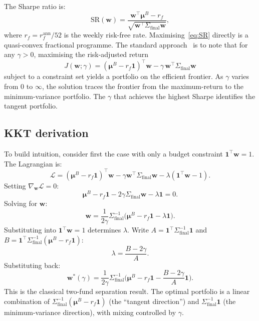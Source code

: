 \documentclass[10pt,twocolumn]{article}
\newcommand{\bw}{\bm{w}}
\newcommand{\bmu}{\bm{\mu}}
\begin{document}
The Sharpe ratio is:
\begin{equation}\label{eq:SR}
\mathrm{SR}(\bw) = \frac{\bw^\top\bmu^B - r_f}
  {\sqrt{\bw^\top\Sigma_{\mathrm{final}}\bw}},
\end{equation}
where $r_f=r_f^{\mathrm{ann}}/52$ is the weekly risk-free rate.
Maximising~\eqref{eq:SR} directly is a quasi-convex fractional
programme.  The standard approach~\cite{cornuejols2007} is to note
that for any $\gamma>0$, maximising the risk-adjusted return
\begin{equation}\label{eq:J}
J(\bw;\gamma) = (\bmu^B{-}r_f\bm{1})^\top\bw
  - \gamma\,\bw^\top\Sigma_{\mathrm{final}}\bw
\end{equation}
subject to a constraint set yields a portfolio on the efficient
frontier.  As $\gamma$ varies from $0$ to $\infty$, the solution
traces the frontier from the maximum-return to the minimum-variance
portfolio.  The $\gamma$ that achieves the highest Sharpe identifies
the tangent portfolio.

\subsection{KKT derivation}

To build intuition, consider first the case with only a budget
constraint $\bm{1}^\top\bw=1$.  The Lagrangian is:
\begin{equation}\label{eq:lagrangian}
\mathcal{L} = (\bmu^B{-}r_f\bm{1})^\top\bw
  - \gamma\bw^\top\Sigma_{\mathrm{final}}\bw
  - \lambda(\bm{1}^\top\bw-1).
\end{equation}
Setting $\nabla_{\bw}\mathcal{L}=0$:
\begin{equation}\label{eq:foc}
\bmu^B - r_f\bm{1} - 2\gamma\Sigma_{\mathrm{final}}\bw
  - \lambda\bm{1} = 0.
\end{equation}
Solving for $\bw$:
\begin{equation}\label{eq:w_closed}
\bw = \frac{1}{2\gamma}\Sigma_{\mathrm{final}}^{-1}
  \big(\bmu^B - r_f\bm{1} - \lambda\bm{1}\big).
\end{equation}
Substituting into $\bm{1}^\top\bw=1$ determines $\lambda$.
Write $A=\bm{1}^\top\Sigma_{\mathrm{final}}^{-1}\bm{1}$ and
$B=\bm{1}^\top\Sigma_{\mathrm{final}}^{-1}(\bmu^B-r_f\bm{1})$:
\begin{equation}\label{eq:lambda}
\lambda = \frac{B - 2\gamma}{A}.
\end{equation}
Substituting back:
\begin{equation}\label{eq:w_final}
\bw^*(\gamma) = \frac{1}{2\gamma}\Sigma_{\mathrm{final}}^{-1}
  \Big(\bmu^B - r_f\bm{1}
  - \frac{B-2\gamma}{A}\bm{1}\Big).
\end{equation}
This is the classical two-fund separation result.  The optimal
portfolio is a linear combination of
$\Sigma_{\mathrm{final}}^{-1}(\bmu^B-r_f\bm{1})$
(the ``tangent direction'') and
$\Sigma_{\mathrm{final}}^{-1}\bm{1}$
(the minimum-variance direction), with mixing controlled by $\gamma$.
\end{document}
